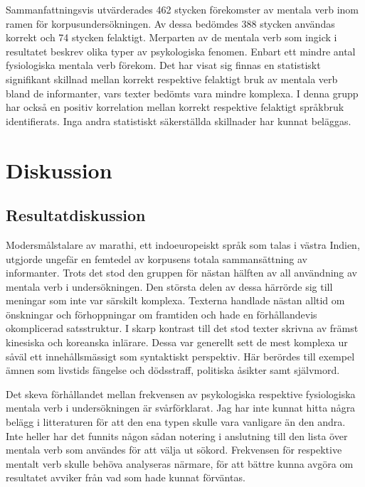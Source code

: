 \documentclass[12pt,a4paper]{article}
\begin{document}
Sammanfattningsvis utvärderades 462 stycken förekomster av mentala verb inom ramen för korpusundersökningen. Av dessa bedömdes 388 stycken användas korrekt och 74 stycken felaktigt. Merparten av de mentala verb som ingick i resultatet beskrev olika typer av psykologiska fenomen. Enbart ett mindre antal fysiologiska mentala verb förekom. Det har visat sig finnas en statistiskt signifikant skillnad mellan korrekt respektive felaktigt bruk av mentala verb bland de informanter, vars texter bedömts vara mindre komplexa. I denna grupp har också en positiv korrelation mellan korrekt respektive felaktigt språkbruk identifierats. Inga andra statistiskt säkerställda skillnader har kunnat beläggas.




\newpage
\section{Diskussion}
\label{ch:Diskussion}

\subsection{Resultatdiskussion}
\label{sec:Diskussion: Resultatdiskussion}
Modersmålstalare av marathi, ett indoeuropeiskt språk som talas i västra Indien, utgjorde ungefär en femtedel av korpusens totala sammansättning av informanter. Trots det stod den gruppen för nästan hälften av all användning av mentala verb i undersökningen. Den största delen av dessa härrörde sig till meningar som inte var särskilt komplexa. Texterna handlade nästan alltid om önskningar och förhoppningar om framtiden och hade en förhållandevis okomplicerad satsstruktur. I skarp kontrast till det stod texter skrivna av främst kinesiska och koreanska inlärare. Dessa var generellt sett de mest komplexa ur såväl ett innehållsmässigt som syntaktiskt perspektiv. Här berördes till exempel ämnen som livstids fängelse och dödsstraff, politiska åsikter samt självmord.

Det skeva förhållandet mellan frekvensen av psykologiska respektive fysiologiska mentala verb i undersökningen är svårförklarat. Jag har inte kunnat hitta några belägg i litteraturen för att den ena typen skulle vara vanligare än den andra. Inte heller har det funnits någon sådan notering i anslutning till den lista över mentala verb som användes för att välja ut sökord. Frekvensen för respektive mentalt verb skulle behöva analyseras närmare, för att bättre kunna avgöra om resultatet avviker från vad som hade kunnat förväntas.
\end{document}
